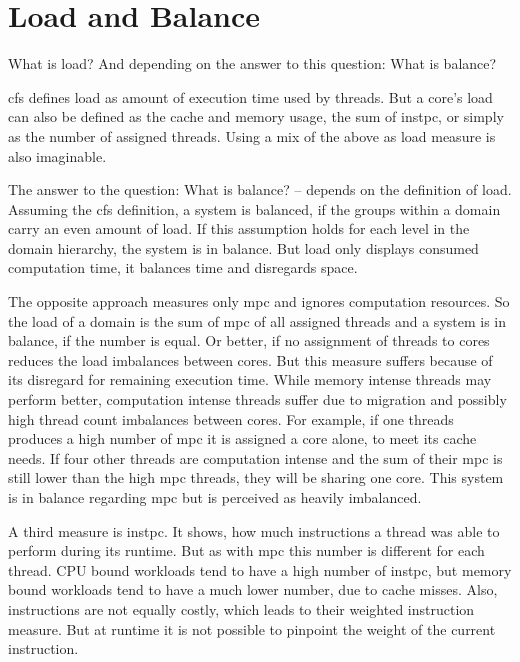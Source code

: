 \section{Load and Balance}
\label{design:load}


What is load?
And depending on the answer to this question: What is balance?

\gls{cfs} defines load as amount of execution time used by threads.
But a core's load can also be defined as
the cache and memory usage, the sum of \gls{instpc}, or simply as the number of
assigned threads.
Using a mix of the above as load measure is also imaginable.

The answer to the question: What is balance? -- depends on the definition of
load.
Assuming the \gls{cfs} definition, a system is balanced, if the groups within a
domain carry an even amount of load.
If this assumption holds for each level in the domain hierarchy, the system is
in balance.
But load only displays consumed computation time, it balances time and
disregards space.

The opposite approach measures only \gls{mpc} and ignores computation
resources.
So the load of a domain is the sum of \gls{mpc} of all assigned threads and a
system is in balance, if the number is equal.
Or better, if no assignment of threads to cores reduces the load imbalances
between cores.
But this measure suffers because of its disregard for remaining execution time.
While memory intense threads may perform better, computation intense threads
suffer due to migration and possibly high thread count imbalances between
cores.
For example, if one threads produces a high number of \gls{mpc} it is assigned a
core alone, to meet its cache needs.
If four other threads are computation intense and the sum of their \gls{mpc} is
still lower than the high \gls{mpc} threads, they will be sharing one core.
This system is in balance regarding \gls{mpc} but is perceived as heavily
imbalanced.

A third measure is \gls{instpc}.
It shows, how much instructions a thread was able to perform during its
runtime.
But as with \gls{mpc} this number is different for each thread.
CPU bound workloads tend to have a high number of \gls{instpc},
but memory bound workloads tend to have a much lower number, due to cache
misses.
Also, instructions are not equally costly, which leads
\citeauthor{snavely_symbiotic_2000} to their weighted instruction measure.
But at runtime it is not possible to pinpoint the weight of the current
instruction.

